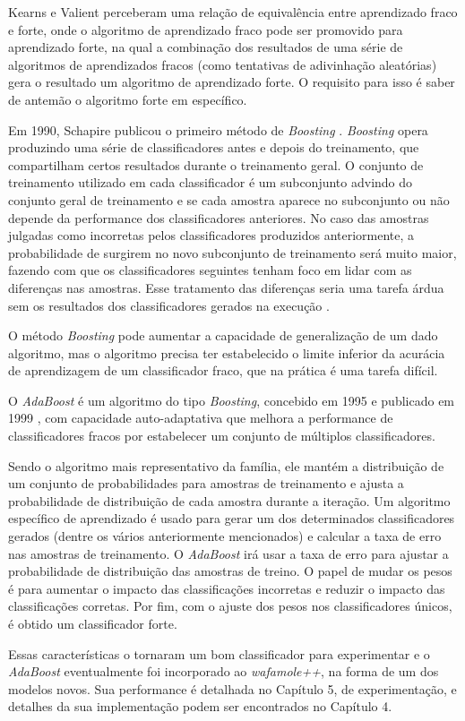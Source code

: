 Kearns e Valient perceberam uma relação de equivalência entre aprendizado fraco e forte, onde o algoritmo de aprendizado fraco pode ser promovido para aprendizado forte, na qual a combinação dos resultados de uma série de algoritmos de aprendizados fracos (como tentativas de adivinhação aleatórias) gera o resultado um algoritmo de aprendizado forte. O requisito para isso é saber de antemão o algoritmo forte em específico.

Em 1990, Schapire publicou o primeiro método de \textit{Boosting} \cite{boosting_schapire1990strength}. \textit{Boosting} opera produzindo uma série de classificadores antes e depois do treinamento, que compartilham certos resultados durante o treinamento geral. O conjunto de treinamento utilizado em cada classificador é um subconjunto advindo do conjunto geral de treinamento e se cada amostra aparece no subconjunto ou não depende da performance dos classificadores anteriores. No caso das amostras julgadas como incorretas pelos classificadores produzidos anteriormente, a probabilidade de surgirem no novo subconjunto de treinamento será muito maior, fazendo com que os classificadores seguintes tenham foco em lidar com as diferenças nas amostras. Esse tratamento das diferenças seria uma tarefa árdua sem os resultados dos classificadores gerados na execução \cite{wu2011some}.

O método \textit{Boosting} pode aumentar a capacidade de generalização de um dado algoritmo, mas o algoritmo precisa ter estabelecido o limite inferior da acurácia de aprendizagem de um classificador fraco, que na prática é uma tarefa difícil.

O \textit{AdaBoost} é um algoritmo do tipo \textit{Boosting}, concebido em 1995 e publicado em 1999 \cite{adaboostfreund1999short}, com capacidade auto-adaptativa que melhora a performance de classificadores fracos por estabelecer um conjunto de múltiplos classificadores. 

Sendo o algoritmo mais representativo da família, ele mantém a distribuição de um conjunto de probabilidades para amostras de treinamento e ajusta a probabilidade de distribuição de cada amostra durante a iteração. Um algoritmo específico de aprendizado é usado para gerar um dos determinados classificadores gerados (dentre os vários anteriormente mencionados) e calcular a taxa de erro nas amostras de treinamento. O \textit{AdaBoost} irá usar a taxa de erro para ajustar a probabilidade de distribuição das amostras de treino. O papel de mudar os pesos é para aumentar o impacto das classificações incorretas e reduzir o impacto das classificações corretas. Por fim, com o ajuste dos pesos nos classificadores únicos, é obtido um classificador forte.

Essas características o tornaram um bom classificador para experimentar e o \textit{AdaBoost} eventualmente foi incorporado ao \textit{wafamole++}, na forma de um dos modelos novos. Sua performance é detalhada no Capítulo 5, de experimentação, e detalhes da sua implementação podem ser encontrados no Capítulo 4.

